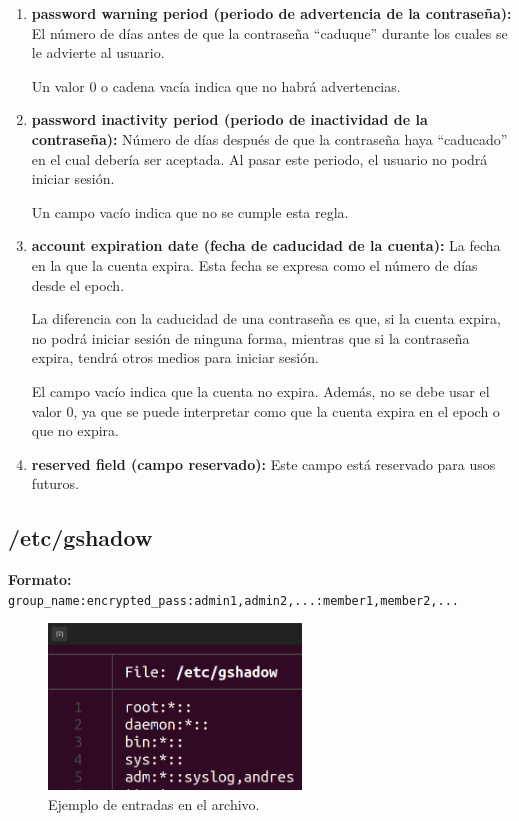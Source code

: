 \documentclass{article}
\begin{document}
\begin{enumerate}
    \item \textbf{password warning period (periodo de advertencia de la contraseña): }El número de días antes de que la contraseña ``caduque'' durante los cuales se le  advierte al usuario.
    
    Un valor 0 o cadena vacía indica que no habrá advertencias.

    \item \textbf{password inactivity period (periodo de inactividad de la contraseña): }Número de días después de que la contraseña haya ``caducado'' en el cual debería ser aceptada. Al pasar este periodo, el usuario no podrá iniciar sesión.
    
    Un campo vacío indica que no se cumple esta regla.

    \item  \textbf{account expiration date (fecha de caducidad de la cuenta): }La fecha en la que la cuenta expira. Esta fecha se expresa como el número de días desde el epoch.
    
    La diferencia con la caducidad de una contraseña es que, si la cuenta expira, no podrá iniciar sesión de ninguna forma, mientras que si la contraseña expira, tendrá otros medios para iniciar sesión.

    El campo vacío indica que la cuenta no expira. Además, no se debe usar el valor 0, ya que se puede interpretar como que la cuenta expira en el epoch o que no expira.

    \item \textbf{reserved field (campo reservado): }Este campo está reservado para usos futuros.
\end{enumerate}


\subsection*{/etc/gshadow}
\textbf{Formato: }\verb|group_name:encrypted_pass:admin1,admin2,...:member1,member2,...|

\bigskip

\begin{figure}[H]
    \centering
    \includegraphics[width=0.6\textwidth]{imagenes/gshadowfile.png}
    \caption{Ejemplo de entradas en el archivo.}    
\end{figure}
\end{document}
